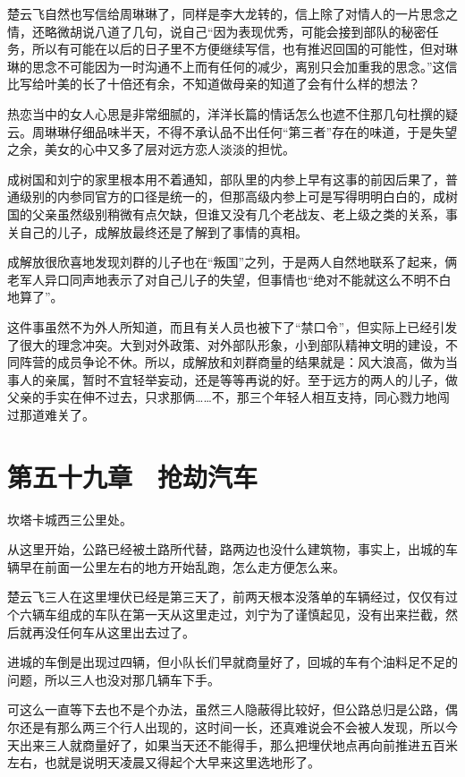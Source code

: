 楚云飞自然也写信给周琳琳了，同样是李大龙转的，信上除了对情人的一片思念之情，还略微胡说八道了几句，说自己“因为表现优秀，可能会接到部队的秘密任务，所以有可能在以后的日子里不方便继续写信，也有推迟回国的可能性，但对琳琳的思念不可能因为一时沟通不上而有任何的减少，离别只会加重我的思念。”这信比写给叶美的长了十倍还有余，不知道做母亲的知道了会有什么样的想法？

热恋当中的女人心思是非常细腻的，洋洋长篇的情话怎么也遮不住那几句杜撰的疑云。周琳琳仔细品味半天，不得不承认品不出任何“第三者”存在的味道，于是失望之余，美女的心中又多了层对远方恋人淡淡的担忧。

成树国和刘宁的家里根本用不着通知，部队里的内参上早有这事的前因后果了，普通级别的内参同官方的口径是统一的，但那高级内参上可是写得明明白白的，成树国的父亲虽然级别稍微有点欠缺，但谁又没有几个老战友、老上级之类的关系，事关自己的儿子，成解放最终还是了解到了事情的真相。

成解放很欣喜地发现刘群的儿子也在“叛国”之列，于是两人自然地联系了起来，俩老军人异口同声地表示了对自己儿子的失望，但事情也“绝对不能就这么不明不白地算了”。

这件事虽然不为外人所知道，而且有关人员也被下了“禁口令”，但实际上已经引发了很大的理念冲突。大到对外政策、对外部队形象，小到部队精神文明的建设，不同阵营的成员争论不休。所以，成解放和刘群商量的结果就是：风大浪高，做为当事人的亲属，暂时不宜轻举妄动，还是等等再说的好。至于远方的两人的儿子，做父亲的手实在伸不过去，只求那俩……不，那三个年轻人相互支持，同心戮力地闯过那道难关了。

\section{第五十九章　抢劫汽车}

坎塔卡城西三公里处。

从这里开始，公路已经被土路所代替，路两边也没什么建筑物，事实上，出城的车辆早在前面一公里左右的地方开始乱跑，怎么走方便怎么来。

楚云飞三人在这里埋伏已经是第三天了，前两天根本没落单的车辆经过，仅仅有过个六辆车组成的车队在第一天从这里走过，刘宁为了谨慎起见，没有出来拦截，然后就再没任何车从这里出去过了。

进城的车倒是出现过四辆，但小队长们早就商量好了，回城的车有个油料足不足的问题，所以三人也没对那几辆车下手。

可这么一直等下去也不是个办法，虽然三人隐蔽得比较好，但公路总归是公路，偶尔还是有那么两三个行人出现的，这时间一长，还真难说会不会被人发现，所以今天出来三人就商量好了，如果当天还不能得手，那么把埋伏地点再向前推进五百米左右，也就是说明天凌晨又得起个大早来这里选地形了。

